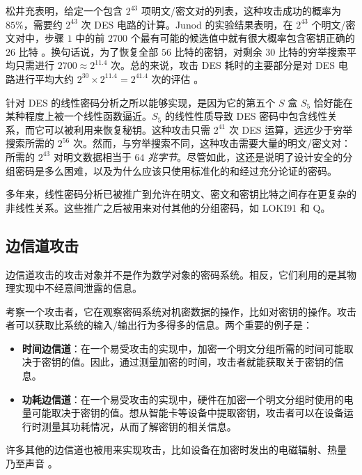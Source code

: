 \begin{snote}
松井充表明，给定一个包含 $2^{43}$ 项明文/密文对的列表，这种攻击成功的概率为 $85\%$，需要约 $2^{43}$ 次 DES 电路的计算。Junod 的实验结果表明，在 $2^{43}$ 个明文/密文对中，步骤 $1$ 中的前 $2700$ 个最有可能的候选值中就有很大概率包含密钥正确的 $26$ 比特 \cite{junod2001complexity}。换句话说，为了恢复全部 $56$ 比特的密钥，对剩余 $30$ 比特的穷举搜索平均只需进行 $2700\approx 2^{11.4}$ 次。总的来说，攻击 DES 耗时的主要部分是对 DES 电路进行平均大约 $2^{30}\times 2^{11.4}=2^{41.4}$ 次的评估 \cite{junod2001complexity}。
\end{snote}

\begin{snote}[教训。]
针对 DES 的线性密码分析之所以能够实现，是因为它的第五个 $S$ 盒 $S_5$ 恰好能在某种程度上被一个线性函数逼近。$S_5$ 的线性性质导致 DES 密码中包含线性关系，而它可以被利用来恢复秘钥。这种攻击只需 $2^{41}$ 次 DES 运算，远远少于穷举搜索所需的 $2^{56}$ 次。然而，与穷举搜索不同，这种攻击需要大量的明文/密文对：所需的 $2^{43}$ 对明文数据相当于 $64$ \emph{兆字节}。尽管如此，这还是说明了设计安全的分组密码是多么困难，以及为什么应该只使用标准化的和经过充分论证的密码。

多年来，线性密码分析已被推广到允许在明文、密文和密钥比特之间存在更复杂的非线性关系。这些推广之后被用来对付其他的分组密码，如 LOKI91 和 Q。
\end{snote}

\subsection{边信道攻击}\label{subsec:4-3-2}

边信道攻击的攻击对象并不是作为数学对象的密码系统。相反，它们利用的是其物理实现中不经意间泄露的信息。

考察一个攻击者，它在观察密码系统对机密数据的操作，比如对密钥的操作。攻击者可以获取比系统的输入/输出行为多得多的信息。两个重要的例子是：
\begin{itemize}
	\item \textbf{时间边信道}：在一个易受攻击的实现中，加密一个明文分组所需的时间可能取决于密钥的值。因此，通过测量加密的时间，攻击者就能获取关于密钥的信息。
	\item \textbf{功耗边信道}：在一个易受攻击的实现中，硬件在加密一个明文分组时使用的电量可能取决于密钥的值。想从智能卡等设备中提取密钥，攻击者可以在设备运行时测量其功耗情况，从而了解密钥的相关信息。
\end{itemize}
许多其他的边信道也被用来实现攻击，比如设备在加密时发出的电磁辐射、热量 \cite{murdoch2006hot} 乃至声音 \cite{genkin2014rsa}。

